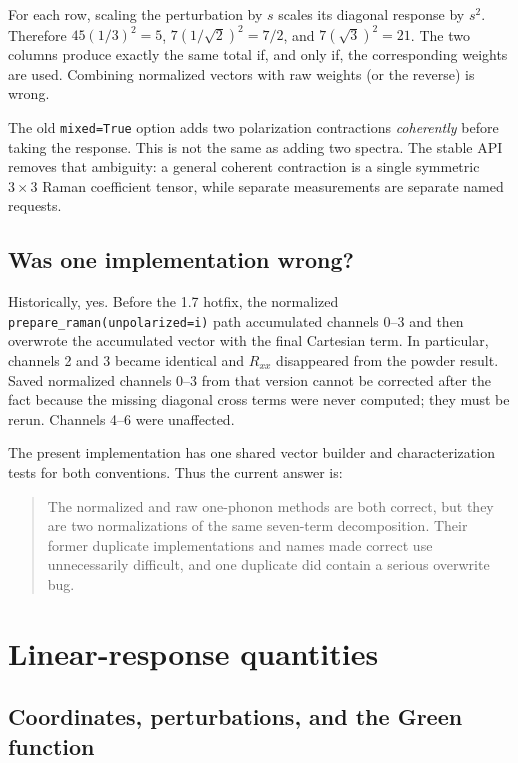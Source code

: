 \documentclass[11pt,a4paper]{article}
\begin{document}
For each row, scaling the perturbation by $s$ scales its diagonal response by
$s^2$.  Therefore $45(1/3)^2=5$, $7(1/\sqrt2)^2=7/2$, and
$7(\sqrt3)^2=21$.  The two columns produce exactly the same total if, and
only if, the corresponding weights are used.  Combining normalized vectors
with raw weights (or the reverse) is wrong.

The old \texttt{mixed=True} option adds two polarization contractions
\emph{coherently} before taking the response.  This is not the same as adding
two spectra.  The stable API removes that ambiguity: a general coherent
contraction is a single symmetric $3\times3$ Raman coefficient tensor, while
separate measurements are separate named requests.

\subsection{Was one implementation wrong?}

Historically, yes.  Before the 1.7 hotfix, the normalized
\texttt{prepare\_raman(unpolarized=i)} path accumulated channels 0--3 and
then overwrote the accumulated vector with the final Cartesian term.  In
particular, channels 2 and 3 became identical and $R_{xx}$ disappeared from
the powder result.  Saved normalized channels 0--3 from that version cannot
be corrected after the fact because the missing diagonal cross terms were
never computed; they must be rerun.  Channels 4--6 were unaffected.

The present implementation has one shared vector builder and characterization
tests for both conventions.  Thus the current answer is:
\begin{quote}
The normalized and raw one-phonon methods are both correct, but they are two
normalizations of the same seven-term decomposition.  Their former duplicate
implementations and names made correct use unnecessarily difficult, and one
duplicate did contain a serious overwrite bug.
\end{quote}

\section{Linear-response quantities}
\label{sec:response}

\subsection{Coordinates, perturbations, and the Green function}
\end{document}
